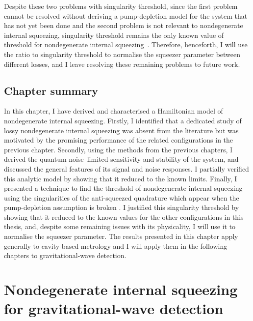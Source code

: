 Despite these two problems with singularity threshold, since the first problem cannot be resolved without deriving a pump-depletion model for the system that has not yet been done  and the second problem is not relevant to nondegenerate internal squeezing, singularity threshold remains the only known value of threshold for nondegenerate internal squeezing~\cite{}. Therefore, henceforth, I will use the ratio to singularity threshold to normalise the squeezer parameter between different losses, and I leave resolving these remaining problems to future work. 


\section{Chapter summary}

In this chapter, I have derived and characterised a Hamiltonian model of nondegenerate internal squeezing. Firstly, I identified that a dedicated study of lossy nondegenerate internal squeezing was absent from the literature but was motivated by the promising performance of the related configurations in the previous chapter. Secondly, using the methods from the previous chapters, I derived the quantum noise--limited sensitivity and stability of the system, and discussed the general features of its signal and noise responses. I partially verified this analytic model by showing that it reduced to the known limits. Finally, I presented a  technique to find the threshold of nondegenerate internal squeezing using the singularities of the anti-squeezed quadrature which appear when the pump-depletion assumption is broken . I justified this singularity threshold by showing that it reduced to the known values for the other configurations in this thesis, and, despite some remaining issues with its physicality, I will use it to normalise the squeezer parameter. 
The results presented in this chapter apply generally to cavity-based metrology and I will apply them in the following chapters to gravitational-wave detection.




\chapter{Nondegenerate internal squeezing for gravitational-wave detection}
\label{chp:science_case}

